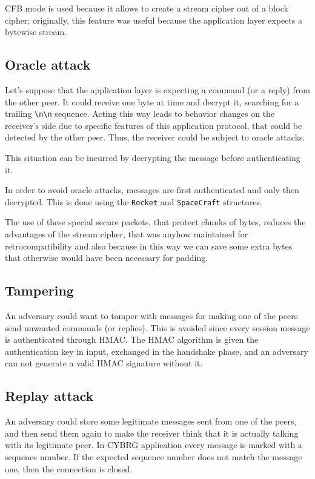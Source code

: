 \documentclass[a4paper,12pt]{article}
\newcommand{\projectname}{CYBRG}
\begin{document}
CFB mode is used because it allows to create a stream cipher out of a block cipher;
originally, this feature was useful because the application layer expects a bytewise stream.

\subsection{Oracle attack}
Let's suppose that the application layer is expecting a command (or a reply) from the other peer.
It could receive one byte at time and decrypt it, searching for a trailing \verb+\n\n+ sequence.
Acting this way leads to behavior changes on the receiver's side due to specific features of this application protocol, that could be detected by the other peer.
Thus, the receiver could be subject to oracle attacks.

This situation can be incurred by decrypting the message before authenticating it.

In order to avoid oracle attacks, messages are first authenticated and only then decrypted.
This is done using the \texttt{Rocket} and \texttt{SpaceCraft} structures.

The use of these special secure packets, that protect chunks of bytes, reduces the advantages of the stream cipher, that was anyhow maintained for retrocompatibility and also because in this way we can save some extra bytes that otherwise would have been necessary for padding.

\subsection{Tampering}
An adversary could want to tamper with messages for making one of the peers send unwanted commands (or replies).
This is avoided since every session message is authenticated through HMAC.
The HMAC algorithm is given the authentication key in input, exchanged in the handshake phase, and an adversary can not generate a valid HMAC signature without it.

\subsection{Replay attack}
An adversary could store some legitimate messages sent from one of the peers, and then send them again to make the receiver think that it is actually talking with its legitimate peer.
In \projectname{} application every message is marked with a sequence number.
If the expected sequence number does not match the message one, then the connection is closed.
\end{document}
